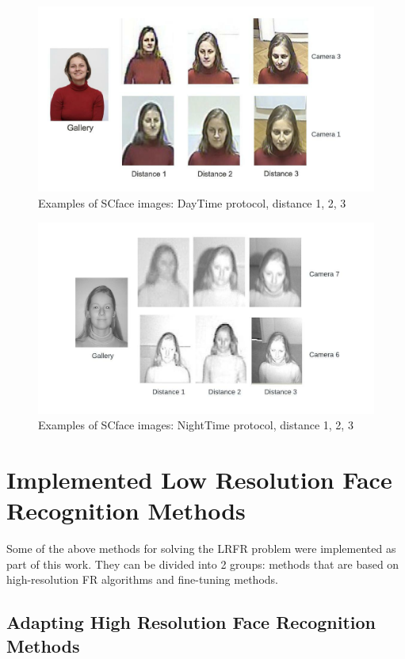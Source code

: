 \documentclass[11pt,a4paper]{article}
\begin{document}
\begin{figure}[ht!]
    \centering
    \includegraphics[width=\textwidth]{scface_day.jpeg}
    \caption{Examples of SCface images: DayTime protocol, distance 1, 2, 3}
    \label{fig:scface_day}
\end{figure}

\begin{figure}[ht!]
    \centering
    \includegraphics[width=\textwidth]{scface_night.jpeg}
    \caption{Examples of SCface images: NightTime protocol, distance 1, 2, 3}
    \label{fig:scface_night}
\end{figure}

\section{Implemented Low Resolution Face Recognition Methods}
Some of the above methods for solving the LRFR problem were implemented as part of this work. They can be divided into 2 groups: methods that are based on high-resolution FR algorithms and fine-tuning methods. 

\subsection{Adapting High Resolution Face Recognition Methods}
\end{document}
